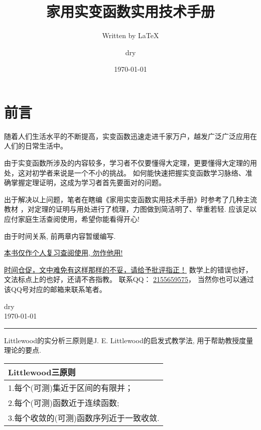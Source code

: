 \documentclass[cn,10pt,math=newtx,citestyle=gb7714-2015,bibstyle=gb7714-2015]{elegantbook}
\title{家用实变函数实用技术手册}
\subtitle{Written by \LaTeX}
\author{dry}
\institute{Department of Mathematics}
\date{\today}
\begin{document}
\maketitle
\frontmatter

\chapter*{前言}

随着人们生活水平的不断提高，实变函数迅速走进千家万户，越发广泛广泛应用在人们的日常生活中。

由于实变函数所涉及的内容较多，学习者不仅要懂得大定理，更要懂得大定理的用处，这对初学者来说是一个不小的挑战。
如何能快速把握实变函数学习脉络、准确掌握定理证明，这成为学习者首先要面对的问题。

出于解决以上问题，笔者在瞎编《家用实变函数实用技术手册》时参考了几种主流教材 
\cite{b1,b2,b3,b4,b5}，对定理的证明与用处进行了梳理，力图做到简洁明了、举重若轻. 
应该足以应付家庭生活查阅使用，希望你能看得开心!
\Winkey[1.3][yellow]

由于时间关系, 前两章内容暂缓编写. 

\vskip 0.3cm
\underline{本书仅作个人复习查阅使用, 勿作他用!}

\vskip 0.3cm
\underline{时间仓促，文中难免有这样那样的不妥，请给予批评指正！}
数学上的错误也好，文法标点上的也好，还请不吝指教。
联系QQ：
\href{https://qm.qq.com/cgi-bin/qm/qr?k=X3d1i1X40fk58mc50cE9P6d_nBPJRDm1&noverify=0}{2155659575}，
当然你也可以通过该QQ号对应的邮箱来联系笔者。


\vskip 1.5cm

\begin{flushright}
dry \\
\today 
\end{flushright}

\vskip 2.5cm
\begin{center}
	{\noindent}\rule[-10pt]{17.5cm}{0.05em}
\end{center}
\vskip 0.5cm

Littlewood的实分析三原则是J. E. Littlewood的启发式教学法, 
用于帮助教授度量理论的要点.

\begin{table*}[htbp]
	\centering
	\begin{tabular}{l}
		\toprule
			Littlewood三原则 \\
		\midrule
			1.每个(可测)集近于区间的有限并；\\
			2.每个(可测)函数近于连续函数; \\
			3.每个收敛的(可测)函数序列近于一致收敛. \\
		\bottomrule
	\end{tabular}
\end{table*}
\end{document}
